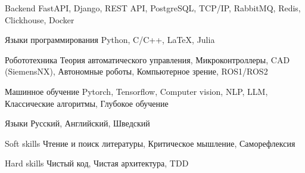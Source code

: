 

\begin{cvskills}

  \cvskill
    {Backend} %
    {FastAPI, Django, REST API, PostgreSQL, TCP/IP, RabbitMQ, Redis, Clickhouse, Docker} %

  \cvskill
    {Языки программирования} %
    {Python, C/C++, LaTeX, Julia} %

  \cvskill
    {Робототехника} %
    {Теория автоматического управления, Микроконтроллеры, CAD (SiemensNX), } %
  \cvskill
    {} %
    {Автономные роботы, Компьютерное зрение, ROS1/ROS2} %

  \cvskill
    {Машинное обучение}
    {Pytorch, Tensorflow, Computer vision, NLP, LLM, Классические алгоритмы, Глубокое обучение}

  \cvskill
    {Языки} %
    {Русский, Английский, Шведский} %

  \cvskill
    {Soft skills} %
    {Чтение и поиск литературы, Критическое мышление, Саморефлексия} %

  \cvskill
    {Hard skills} %
    {Чистый код, Чистая архитектура, TDD} %

\end{cvskills}
